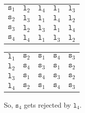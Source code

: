 \documentclass[a4paper, openany]{memoir}
\begin{document}
    \begin{table}[H]
        \centering
        \begin{subtable}{0.45\textwidth}
            \centering
            \begin{tabular}{c|cccc}
                $\texttt{s}_1$ & {\color{gray} $\texttt{l}_2$} & \underline{$\texttt{l}_4$} & $\texttt{l}_1$ & $\texttt{l}_3$ \\
                $\texttt{s}_2$ & \underline{$\texttt{l}_3$} & $\texttt{l}_1$ & $\texttt{l}_4$ & $\texttt{l}_2$ \\
                $\texttt{s}_3$ & \underline{$\texttt{l}_2$} & $\texttt{l}_3$ & $\texttt{l}_1$ & $\texttt{l}_4$ \\
                $\texttt{s}_4$ & {\color{gray} $\texttt{l}_4$} & $\texttt{l}_1$ & $\texttt{l}_3$ & $\texttt{l}_2$
            \end{tabular}
        \end{subtable}
        \hfill
        \begin{subtable}{0.45\textwidth}
            \centering
            \begin{tabular}{c|cccc}
                $\texttt{l}_1$ & $\texttt{s}_2$ & $\texttt{s}_1$ & $\texttt{s}_4$ & $\texttt{s}_3$ \\
                $\texttt{l}_2$ & $\texttt{s}_4$ & \underline{$\texttt{s}_3$} & $\texttt{s}_1$ & $\texttt{s}_2$ \\
                $\texttt{l}_3$ & $\texttt{s}_1$ & $\texttt{s}_4$ & $\texttt{s}_3$ & \underline{$\texttt{s}_2$} \\
                $\texttt{l}_4$ & $\texttt{s}_2$ & \underline{$\texttt{s}_1$} & $\texttt{s}_4$ & $\texttt{s}_3$
            \end{tabular}
        \end{subtable}
    \end{table}
    \noindent So, $\texttt{s}_4$ gets rejected by $\texttt{l}_4$.
\end{document}
